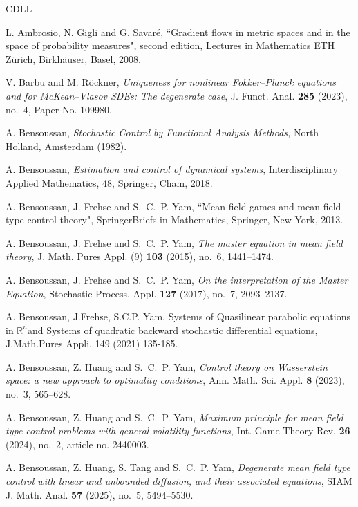 \documentclass[11pt]{article}
\numberwithin{equation}{section}
\newcommand{\brn}{{\mathbb{R}^n}}
\newcommand{\1}{\mbox{1\hspace{-1mm}I}}
\begin{document}
\begin{thebibliography}{CDLL}

 L. Ambrosio, N. Gigli and G. Savar\'e, ``Gradient flows in metric spaces and in the space of probability measures", second edition,  Lectures in Mathematics ETH Z\"urich, Birkh\"auser, Basel, 2008.

 V. Barbu and M. R{\"o}ckner, \textit{Uniqueness for nonlinear Fokker--Planck equations and for McKean--Vlasov SDEs: The degenerate case}, J. Funct. Anal. \textbf{285} (2023), no.~4, Paper No. 109980.

 A. Bensoussan, \textit{Stochastic Control by Functional Analysis Methods,} North Holland, Amsterdam (1982). 

A. Bensoussan, {\it Estimation and control of dynamical systems}, Interdisciplinary Applied Mathematics, 48, Springer, Cham, 2018.

 A. Bensoussan, J. Frehse and S.~C.~P. Yam, ``Mean field games and mean field type control theory", SpringerBriefs in Mathematics, Springer, New York, 2013.

 A. Bensoussan, J. Frehse and S.~C.~P. Yam, \textit{The master equation in mean field theory}, J. Math. Pures Appl. (9) \textbf{103} (2015), no.~6, 1441--1474.

 A. Bensoussan, J. Frehse and S.~C.~P. Yam, \textit{On the interpretation of the Master Equation}, Stochastic Process. Appl. \textbf{127} (2017), no.~7, 2093--2137.

A. Bensoussan, J.Frehse, S.C.P. Yam, Systems of Quasilinear parabolic equations in $\brn$and Systems of quadratic backward stochastic differential equations, J.Math.Pures Appli. 149 (2021) 135-185.

 A. Bensoussan, Z. Huang and S.~C.~P. Yam, \textit{Control theory on Wasserstein space: a new approach to optimality conditions}, Ann. Math. Sci. Appl. \textbf{8} (2023), no.~3, 565--628.

 A. Bensoussan, Z. Huang and S.~C.~P. Yam, \textit{Maximum principle for mean field type control problems with general volatility functions}, Int. Game Theory Rev. \textbf{26} (2024), no.~2, article no. 2440003.
	
 A. Bensoussan, Z. Huang, S. Tang and S.~C.~P. Yam, \textit{Degenerate mean field type control with linear and unbounded diffusion, and their associated equations}, SIAM J. Math. Anal. \textbf{57} (2025), no.~5, 5494--5530.


\end{thebibliography}
\end{document}
